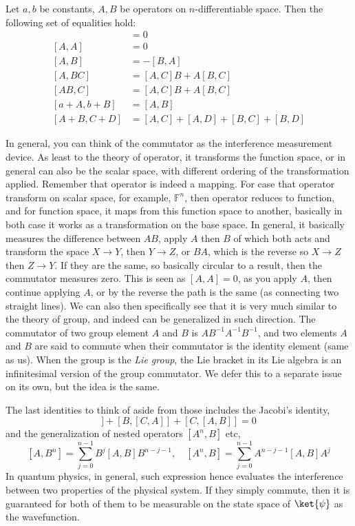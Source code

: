 \begin{theorem}
    Let $a,b$ be constants, $A,B$ be operators on $n$-differentiable space. Then the following set of equalities hold: 
    \begin{align}
        [f(x),x] & = 0\\
        [A,A] & = 0 \\
        [A,B] & = - [B,A]\\
        [A,BC] & = [A,C]B + A[B,C]\\
        [AB,C] & = [A,C]B + A [B, C]\\
        [a+ A, b+ B] & = [A, B]\\
        [A+B, C+D] &= [A,C] + [A,D] + [B,C] + [B,D]
    \end{align}
\end{theorem}
In general, you can think of the commutator as the interference measurement device. As least to the theory of operator, it transforms the function space, or in general can also be the scalar space, with different ordering of the transformation applied. Remember that operator is indeed a mapping. For case that operator transform on scalar space, for example, $\mathbb{F}^{n}$, then operator reduces to function, and for function space, it maps from this function space to another, basically in both case it works as a transformation on the base space. In general, it basically measures the difference between $AB$, apply $A$ then $B$ of which both acts and transform the space $X\to Y$, then $Y\to Z$, or $BA$, which is the reverse so $X\to Z$ then $Z\to Y$. If they are the same, so basically circular to a result, then the commutator measures zero. This is seen as $[A,A]=0$, as you apply $A$, then continue applying $A$, or by the reverse the path is the same (as connecting two straight lines). We can also then specifically see that it is very much similar to the theory of group, and indeed can be generalized in such direction. The commutator of two group element $A$ and $B$ is $AB^{-1}A^{-1}B^{-1}$, and two elements $A$ and $B$ are said to commute when their commutator is the identity element (same as us). When the group is the \textit{Lie group}, the Lie bracket in its Lie algebra is an infinitesimal version of the group commutator. We defer this to a separate issue on its own, but the idea is the same. 

The last identities to think of aside from those includes the Jacobi's identity, 
\begin{equation}
    [A,[B,C]] + [B,[C,A]] + [C,[A,B]] = 0
\end{equation}
and the generalization of nested operators $[A^n, B]$ etc, 
\begin{equation}
    \left[A,B^{n}\right] = \sum^{n-1}_{j=0}B^{j}[A,B]B^{n-j-1}, \quad \left[A^{n},B\right] = \sum^{n-1}_{j=0} A^{n-j-1}[A,B]A^{j}
\end{equation}
In quantum physics, in general, such expression hence evaluates the interference between two properties of the physical system. If they simply commute, then it is guaranteed for both of them to be measurable on the state space of $\ket{\psi}$ as the wavefunction. 

